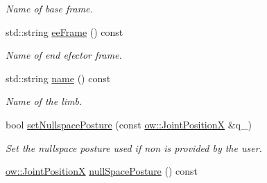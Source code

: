 \begin{DoxyCompactItemize}
\begin{DoxyCompactList}\small\item\em Name of base frame. \end{DoxyCompactList}\item 
std\+::string \hyperlink{classow__ik_1_1RobotLimb_a1acf313b3eeeeaa230a55b3ee2355770}{ee\+Frame} () const \hypertarget{classow__ik_1_1RobotLimb_a1acf313b3eeeeaa230a55b3ee2355770}{}\label{classow__ik_1_1RobotLimb_a1acf313b3eeeeaa230a55b3ee2355770}

\begin{DoxyCompactList}\small\item\em Name of end efector frame. \end{DoxyCompactList}\item 
std\+::string \hyperlink{classow__ik_1_1RobotLimb_a3aaf05a2d919e792562226691ce1d0ad}{name} () const \hypertarget{classow__ik_1_1RobotLimb_a3aaf05a2d919e792562226691ce1d0ad}{}\label{classow__ik_1_1RobotLimb_a3aaf05a2d919e792562226691ce1d0ad}

\begin{DoxyCompactList}\small\item\em Name of the limb. \end{DoxyCompactList}\item 
bool \hyperlink{classow__ik_1_1RobotLimb_a98b22c8fce49481b5a96910724284208}{set\+Nullspace\+Posture} (const \hyperlink{classow__core_1_1JointPosition}{ow\+::\+Joint\+PositionX} \&q\+\_)\hypertarget{classow__ik_1_1RobotLimb_a98b22c8fce49481b5a96910724284208}{}\label{classow__ik_1_1RobotLimb_a98b22c8fce49481b5a96910724284208}

\begin{DoxyCompactList}\small\item\em Set the nullspace posture used if non is provided by the user. \end{DoxyCompactList}\item 
\hyperlink{classow__core_1_1JointPosition}{ow\+::\+Joint\+PositionX} \hyperlink{classow__ik_1_1RobotLimb_a8a262cf4ec142bba5ee1572344e90dfd}{null\+Space\+Posture} () const \hypertarget{classow__ik_1_1RobotLimb_a8a262cf4ec142bba5ee1572344e90dfd}{}\label{classow__ik_1_1RobotLimb_a8a262cf4ec142bba5ee1572344e90dfd}


\end{DoxyCompactItemize}
